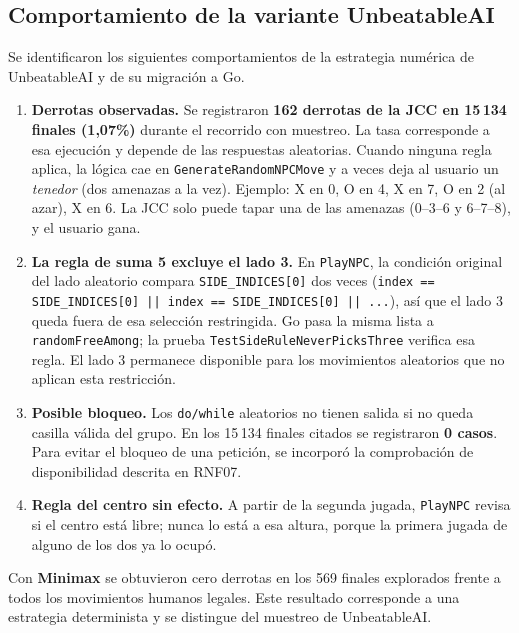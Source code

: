 \documentclass[12pt,a4paper]{article}
\begin{document}
\subsection{Comportamiento de la variante UnbeatableAI}\label{sec:hallazgos}
Se identificaron los siguientes comportamientos de la estrategia numérica de
UnbeatableAI y de su migración a Go.

\begin{enumerate}
  \item \textbf{Derrotas observadas.} Se registraron \textbf{162 derrotas de la JCC
        en 15\,134 finales (1,07\%)} durante el recorrido con muestreo. La tasa
        corresponde a esa ejecución y depende de las respuestas aleatorias. Cuando
        ninguna regla aplica, la lógica cae en \texttt{GenerateRandomNPCMove}
        y a veces deja al usuario un \emph{tenedor} (dos amenazas a la vez).
        Ejemplo: X en 0, O en 4, X en 7, O en 2 (al azar), X en 6. La JCC solo
        puede tapar una de las amenazas (0--3--6 y 6--7--8), y el usuario gana.
  \item \textbf{La regla de suma 5 excluye el lado 3.} En \texttt{PlayNPC}, la condición original del
        lado aleatorio compara \texttt{SIDE\_INDICES[0]} dos veces
        (\texttt{index == SIDE\_INDICES[0] || index == SIDE\_INDICES[0] || ...}),
        así que el lado 3 queda fuera de esa selección restringida. Go pasa la misma
        lista a \texttt{randomFreeAmong}; la prueba
        \texttt{TestSideRuleNeverPicksThree} verifica esa regla. El lado 3 permanece
        disponible para los movimientos aleatorios que no aplican esta restricción.
  \item \textbf{Posible bloqueo.} Los \texttt{do/while} aleatorios no tienen
        salida si no queda casilla válida del grupo. En los 15\,134 finales citados
        se registraron \textbf{0 casos}. Para evitar el bloqueo de una petición,
        se incorporó la comprobación de disponibilidad descrita en RNF07.
  \item \textbf{Regla del centro sin efecto.} A partir de la segunda jugada,
        \texttt{PlayNPC} revisa si el centro está libre; nunca lo está a esa
        altura, porque la primera jugada de alguno de los dos ya lo ocupó.
\end{enumerate}

Con \textbf{Minimax} se obtuvieron cero derrotas en los 569 finales explorados
frente a todos los movimientos humanos legales. Este resultado corresponde a
una estrategia determinista y se distingue del muestreo de UnbeatableAI.
\end{document}
